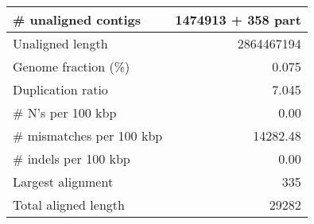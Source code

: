 \documentclass[12pt,a4paper]{article}
\begin{document}
\begin{table}[ht]
\begin{center}
\begin{tabular}{|l*{1}{|r}|}
\# unaligned contigs & 1474913 + 358 part \\ \hline
Unaligned length & 2864467194 \\ \hline
Genome fraction (\%) & 0.075 \\ \hline
Duplication ratio & 7.045 \\ \hline
\# N's per 100 kbp & 0.00 \\ \hline
\# mismatches per 100 kbp & 14282.48 \\ \hline
\# indels per 100 kbp & 0.00 \\ \hline
Largest alignment & 335 \\ \hline
Total aligned length & 29282 \\ \hline
\end{tabular}
\end{center}
\end{table}
\end{document}
